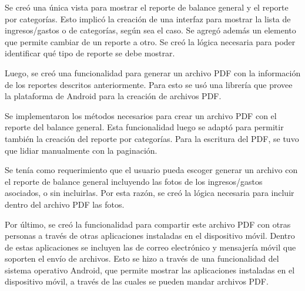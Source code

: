 Se creó una única vista para mostrar el reporte de balance general y el reporte por categorías. Esto implicó la creación de una interfaz para mostrar la lista de ingresos/gastos o de categorías, según sea el caso. Se agregó además un elemento que permite cambiar de un reporte a otro. Se creó la lógica necesaria para poder identificar qué tipo de reporte se debe mostrar.

Luego, se creó una funcionalidad para generar un archivo PDF con la información de los reportes descritos anteriormente. Para esto se usó una librería que provee la plataforma de Android para la creación de archivos PDF.  

Se implementaron los métodos necesarios para crear un archivo PDF con el reporte del balance general. Esta funcionalidad luego se adaptó para permitir también la creación del reporte por categorías. Para la escritura del PDF, se tuvo que lidiar manualmente con la paginación. 

Se tenía como requerimiento que el usuario pueda escoger generar un archivo con el reporte de balance general incluyendo las fotos de los ingresos/gastos asociados, o sin incluirlas. Por esta razón, se creó la lógica necesaria para incluir dentro del archivo PDF las fotos.

Por último, se creó la funcionalidad para compartir este archivo PDF con otras personas a través de otras aplicaciones instaladas en el dispositivo móvil. Dentro de estas aplicaciones se incluyen las de correo electrónico y mensajería móvil que soporten el envío de archivos. Esto se hizo a través de una funcionalidad del sistema operativo Android, que permite mostrar las aplicaciones instaladas en el dispositivo móvil, a través de las cuales se pueden mandar archivos PDF.




